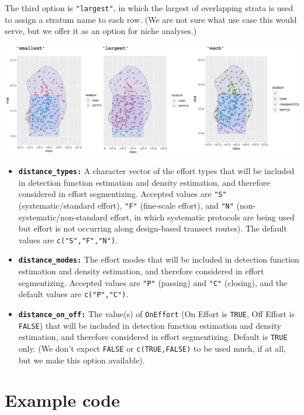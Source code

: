 \documentclass[
]{book}
\begin{document}
The third option is \texttt{"largest"}, in which the largest of overlapping strata is used to assign a stratum name to each row. (We are not sure what use case this would serve, but we offer it as an option for niche analyses.)

\includegraphics{img/strata_overlap_marianas.png}

\begin{itemize}
\item
  \textbf{\texttt{distance\_types:}} A character vector of the effort types that will be included in detection function estimation and density estimation, and therefore considered in effort segmentizing. Accepted values are \texttt{"S"} (systematic/standard effort), \texttt{"F"} (fine-scale effort), and \texttt{"N"} (non-systematic/non-standard effort, in which systematic protocols are being used but effort is not occurring along design-based transect routes). The default values are \texttt{c("S","F","N")}.
\item
  \textbf{\texttt{distance\_modes:}} The effort modes that will be included in detection function estimation and density estimation, and therefore considered in effort segmentizing. Accepted values are \texttt{"P"} (passing) and \texttt{"C"} (closing), and the default values are \texttt{c("P","C")}.
\item
  \textbf{\texttt{distance\_on\_off:}} The value(s) of \texttt{OnEffort} (On Effort is \texttt{TRUE}, Off Effort is \texttt{FALSE}) that will be included in detection function estimation and density estimation, and therefore considered in effort segmentizing. Default is \texttt{TRUE} only. (We don't expect \texttt{FALSE} or \texttt{c(TRUE,FALSE)} to be used much, if at all, but we make this option available).
\end{itemize}

\hypertarget{example-code}{%
\section*{Example code}\label{example-code}}
\end{document}

